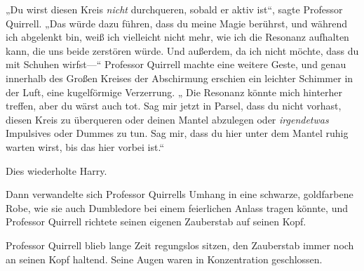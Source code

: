 „Du wirst diesen Kreis \emph{nicht} durchqueren, sobald er aktiv ist“, sagte Professor Quirrell. „Das würde dazu führen, dass du meine Magie berührst, und während ich abgelenkt bin, weiß ich vielleicht nicht mehr, wie ich die Resonanz aufhalten kann, die uns beide zerstören würde. Und außerdem, da ich nicht möchte, dass du mit Schuhen wirfst—“ Professor Quirrell machte eine weitere Geste, und genau innerhalb des Großen Kreises der Abschirmung erschien ein leichter Schimmer in der Luft, eine kugelförmige Verzerrung. „ Die Resonanz könnte mich hinterher treffen, aber du wärst auch tot. Sag mir jetzt in Parsel, dass du nicht vorhast, diesen Kreis zu überqueren oder deinen Mantel abzulegen oder \emph{irgendetwas} Impulsives oder Dummes zu tun. Sag mir, dass du hier unter dem Mantel ruhig warten wirst, bis das hier vorbei ist.“

Dies wiederholte Harry.

Dann verwandelte sich Professor Quirrells Umhang in eine schwarze, goldfarbene Robe, wie sie auch Dumbledore bei einem feierlichen Anlass tragen könnte, und Professor Quirrell richtete seinen eigenen Zauberstab auf seinen Kopf.

Professor Quirrell blieb lange Zeit regungslos sitzen, den Zauberstab immer noch an seinen Kopf haltend. Seine Augen waren in Konzentration geschlossen.

